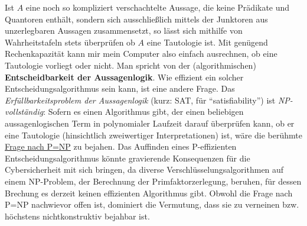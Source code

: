\begin{vorschau} \label{entscheidbar}
    Ist $A$ eine noch so kompliziert verschachtelte Aussage, die keine Prädikate und Quantoren enthält, sondern sich ausschließlich mittels der Junktoren aus unzerlegbaren Aussagen zusammensetzt, so lässt sich mithilfe von Wahrheitstafeln stets überprüfen ob $A$ eine Tautologie ist. Mit genügend Rechenkapazität kann mir mein Computer also einfach ausrechnen, ob eine Tautologie vorliegt oder nicht. Man spricht von der (algorithmischen) \textbf{Entscheidbarkeit der Aussagenlogik}. Wie effizient ein solcher Entscheidungsalgorithmus sein kann, ist eine andere Frage. Das \emph{Erfüllbarkeitsproblem der Aussagenlogik} (kurz: SAT, für ``satisfiability'') ist \emph{NP-vollständig}: Sofern es einen Algorithmus gibt, der einen beliebigen aussagenlogischen Term in polynomialer Laufzeit darauf überprüfen kann, ob er eine Tautologie (hinsichtlich zweiwertiger Interpretationen) ist, wäre die berühmte \href{https://de.wikipedia.org/wiki/P-NP-Problem}{Frage nach P=NP} zu bejahen. Das Auffinden eines P-effizienten Entscheidungsalgorithmus könnte gravierende Konsequenzen für die Cybersicherheit mit sich bringen, da diverse Verschlüsselungsalgorithmen auf einem NP-Problem, der Berechnung der Primfaktorzerlegung, beruhen, für dessen Brechung es derzeit keinen effizienten Algorithmus gibt. Obwohl die Frage nach P=NP nachwievor offen ist, dominiert die Vermutung, dass sie zu verneinen bzw. höchstens nichtkonstruktiv bejahbar ist.


\end{vorschau}
